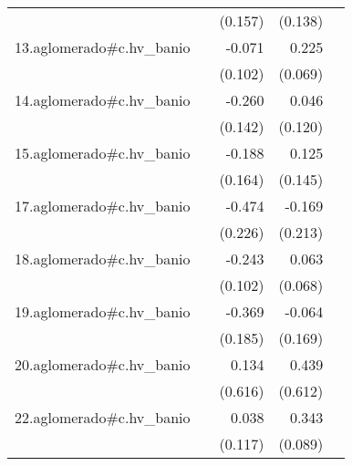 {\begin{longtable}{l*{4}{D{.}{.}{-1}}}
            &                     &     (0.157)         &     (0.138)         &                     \\
\addlinespace
13.aglomerado#c.hv\_banio&                     &      -0.071         &       0.225\sym{**} &                     \\
            &                     &     (0.102)         &     (0.069)         &                     \\
\addlinespace
14.aglomerado#c.hv\_banio&                     &      -0.260         &       0.046         &                     \\
            &                     &     (0.142)         &     (0.120)         &                     \\
\addlinespace
15.aglomerado#c.hv\_banio&                     &      -0.188         &       0.125         &                     \\
            &                     &     (0.164)         &     (0.145)         &                     \\
\addlinespace
17.aglomerado#c.hv\_banio&                     &      -0.474\sym{*}  &      -0.169         &                     \\
            &                     &     (0.226)         &     (0.213)         &                     \\
\addlinespace
18.aglomerado#c.hv\_banio&                     &      -0.243\sym{*}  &       0.063         &                     \\
            &                     &     (0.102)         &     (0.068)         &                     \\
\addlinespace
19.aglomerado#c.hv\_banio&                     &      -0.369\sym{*}  &      -0.064         &                     \\
            &                     &     (0.185)         &     (0.169)         &                     \\
\addlinespace
20.aglomerado#c.hv\_banio&                     &       0.134         &       0.439         &                     \\
            &                     &     (0.616)         &     (0.612)         &                     \\
\addlinespace
22.aglomerado#c.hv\_banio&                     &       0.038         &       0.343\sym{***}&                     \\
            &                     &     (0.117)         &     (0.089)         &                     \\

\end{longtable}}
